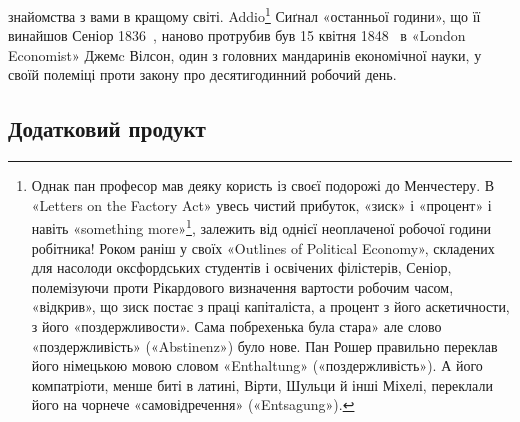 \parcont{}  %
знайомства з вами в кращому світі. Addio\footnote{
Однак пан професор мав деяку користь із своєї подорожі до Менчестеру.
В «Letters on the Factory Act» увесь чистий прибуток, «зиск» і «процент» і
навіть «something more»\footnote*{
— щось більше. \emph{Ред}.
}, залежить від
однієї неоплаченої
робочої години робітника! Роком раніш у своїх «Outlines of Political Economy»,
складених для насолоди оксфордських студентів і освічених філістерів, Сеніор,
полемізуючи проти Рікардового визначення вартости робочим часом, «відкрив», що
зиск постає з праці капіталіста, а процент з його
аскетичности, з його «поздержливости». Сама побрехенька була стара» але слово
«поздержливість» («Abstinenz») було нове. Пан Рошер правильно переклав його
німецькою мовою словом «Enthaltung» («поздержливість»). А його компатріоти,
менше биті в латині, Вірти, Шульци
й інші Міхелі, переклали його на чорнече «самовідречення» («Entsagung»).
} Сиґнал «останньої години», що її винайшов Сеніор 1836~, наново протрубив
був 15 квітня 1848~ в «London Economist» Джемc Вілсон, один з головних
мандаринів економічної науки, у своїй полеміці проти
закону про десятигодинний робочий день.
\subsection{Додатковий продукт}


